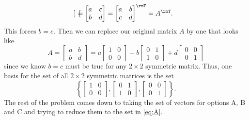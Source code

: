 \begin{questions}
\begin{solution}
\[\begin{bmatrix}
      \end{bmatrix}
      =
      \begin{bmatrix}
        a&c\\b&d
      \end{bmatrix}
      =
      \begin{bmatrix}
        a&b\\c&d
      \end{bmatrix}^\rmT=A^\rmT.
    \]
    This forces $b=c$. Then we can replace our original matrix $A$ by one
    that looks like
    \[
      A=\begin{bmatrix}
        a&b\\
        b&d
      \end{bmatrix}= a\begin{bmatrix}
        1&0\\
        0&0
      \end{bmatrix}+ b\begin{bmatrix}
        0&1\\
        1&0
      \end{bmatrix}+ d\begin{bmatrix}
        0&0\\
        0&1
      \end{bmatrix}
    \]
    since we know $b=c$ must be true for any $2\times 2$ symmetric matrix.
    Thus, one basis for the set of all $2\times 2$ symmetric matrices is
    the set
    \[
      \label{eq:A}
      \tag{$\bigstar$} \left\{
        \begin{bmatrix}1&0\\0&0\end{bmatrix},
        \begin{bmatrix}0&1\\1&0\end{bmatrix},
        \begin{bmatrix}0&0\\0&1\end{bmatrix} \right\}.
    \]
    The rest of the problem comes down to taking the set of vectors for
    options A, B and C and trying to reduce them to the set in
    \eqref{eq:A}.
  \end{solution}


\end{questions}
